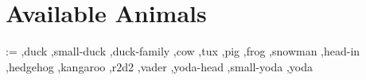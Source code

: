 \documentclass[]{article}
\makeatletter
\newcommand*{\availableAnimal}[1]{\@for\cs:=#1\do{%
  \ifx\cs\@empty\else%
    \rlap{\expandafter\ducksay\expandafter[\cs]{\cs}}\hfill\mbox{}\\[1ex]%
  \fi%
}}
\makeatother
\begin{document}
\section{Available Animals}\label{sec:animals}%
\small
\begin{multicols}{2}
\raggedbottom
\availableAnimal{%
  ,duck%
  ,small-duck%
  ,duck-family%
  ,cow%
  ,tux%
  ,pig%
  ,frog%
  ,snowman%
  ,head-in%
  ,hedgehog%
  ,kangaroo%
  ,r2d2%
  ,vader%
  ,yoda-head%
  ,small-yoda%
  ,yoda%
}%
\end{multicols}
\clearpage
\thispagestyle{empty}
\bgroup
\Huge
\mbox{}\vfill
\centering
{}
\vfill
\hfill{}
\egroup
\end{document}

